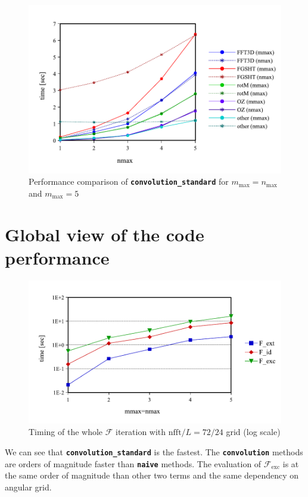 \begin{figure}[H]
\begin{centering}
\includegraphics[bb=0bp 20bp 639bp 268bp,width=1\columnwidth]{_figure/results/nmax}
\par\end{centering}
\caption[Performance comparison of ``convolution\_standard'' for $m_{\max}=n_{\max}$
and $m_{\max}=5$]{Performance comparison of \texttt{\textbf{convolution\_standard}}
for $m_{\max}=n_{\max}$ and $m_{\max}=5$\label{fig:comparison-nmax}}
\end{figure}


\section{Global view of the code performance}

\begin{figure}[H]
\begin{centering}
\includegraphics[bb=0bp 20bp 453bp 236bp,scale=0.7]{_figure/results/global_perf}
\par\end{centering}
\caption[Timing of the whole $\mathcal{F}$ iteration]{Timing of the whole $\mathcal{F}$ iteration with $\mathrm{nfft}/L=72/24$
grid (log scale)}
\end{figure}

We can see that \texttt{\textbf{convolution\_standard}} is the fastest.
The \texttt{\textbf{convolution}} methods are orders of magnitude
faster than \texttt{\textbf{naive}} methods. The evaluation of $\mathcal{F}_{\mathrm{exc}}$
is at the same order of magnitude than other two terms and the same
dependency on angular grid.
